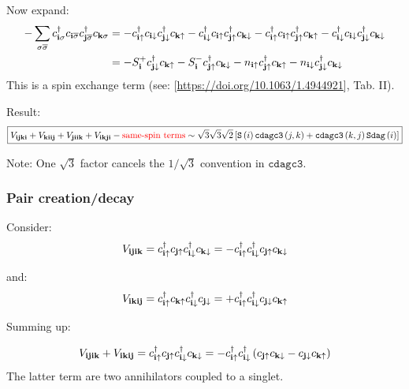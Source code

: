 \documentclass[12pt,paper=a4,BCOR=16mm]{article}
\newcommand{\cs}[1]{c_{#1\sigma}}
\newcommand{\cdags}[1]{c^{\dagger}_{#1\sigma}}
\newcommand{\cS}[1]{c_{#1\overline{\sigma}}}
\newcommand{\cdagS}[1]{c^{\dagger}_{#1\overline{\sigma}}}
\newcommand{\cUP}[1]{c_{#1\uparrow}}
\newcommand{\cdagUP}[1]{c^{\dagger}_{#1\uparrow}}
\newcommand{\cDN}[1]{c_{#1\downarrow}}
\newcommand{\cdagDN}[1]{c^{\dagger}_{#1\downarrow}}
\newcommand{\nUP}[1]{n_{#1\uparrow}}
\newcommand{\nDN}[1]{n_{#1\downarrow}}
\begin{document}
Now expand:
\begin{equation}
\begin{split}
-\sum_{\sigma\overline{\sigma}} \cdags{\v{i}} \cS{\v{i}} \cdagS{\v{j}} \cs{\v{k}} 
&= 
-\cdagUP{\v{i}} \cDN{\v{i}} \cdagDN{\v{j}} \cUP{\v{k}}
-\cdagDN{\v{i}} \cUP{\v{i}} \cdagUP{\v{j}} \cDN{\v{k}}
-\cdagUP{\v{i}} \cUP{\v{i}} \cdagUP{\v{j}} \cUP{\v{k}}
-\cdagDN{\v{i}} \cDN{\v{i}} \cdagDN{\v{j}} \cDN{\v{k}} \\
&= 
-S^+_{\v{i}} \cdagDN{\v{j}} \cUP{\v{k}} 
-S^-_{\v{i}} \cdagUP{\v{j}} \cDN{\v{k}}
-\nUP{\v{i}} \cdagUP{\v{j}} \cUP{\v{k}}
-\nDN{\v{i}} \cdagDN{\v{j}} \cDN{\v{k}}
\end{split}
\end{equation}
This is a spin exchange term (see: [\url{https://doi.org/10.1063/1.4944921}], Tab. II).

Result:
\begin{equation}
\boxed{ V_{\mathbf{ijki}} + V_{\mathbf{kiij}} + V_{\mathbf{jiik}} + V_{\mathbf{ikji}} - {\color{red}\text{same-spin terms}} 
\sim \sqrt{3}\sqrt{3}\sqrt{2} \left[ \mathtt{S}\left(i\right) \mathtt{cdagc3}\left(j,k\right) + \mathtt{cdagc3}\left(k,j\right) \mathtt{Sdag}\left(i\right) \right]
}
\end{equation}

Note: One $\sqrt{3}$ factor cancels the $1/\sqrt{3}$ convention in $\mathtt{cdagc3}$.

\subsubsection{Pair creation/decay}

Consider:
\begin{equation}
V_{\v{ijik}} = \cdagUP{\v{i}} \cUP{\v{j}} \cdagDN{\v{i}} \cDN{\v{k}} 
= - \cdagUP{\v{i}}\cdagDN{\v{i}} \cUP{\v{j}}\cDN{\v{k}}
\end{equation}

and: 
\begin{equation}
V_{\v{ikij}} = \cdagUP{\v{i}} \cUP{\v{k}} \cdagDN{\v{i}} \cDN{\v{j}} 
= +\cdagUP{\v{i}}\cdagDN{\v{i}} \cDN{\v{j}}\cUP{\v{k}}
\end{equation}

Summing up:

\begin{equation}
V_{\v{ijik}} + V_{\v{ikij}} = 
\cdagUP{\v{i}} \cUP{\v{j}} \cdagDN{\v{i}} \cDN{\v{k}} 
= - \cdagUP{\v{i}}\cdagDN{\v{i}} \lr{ \cUP{\v{j}}\cDN{\v{k}} - \cDN{\v{j}}\cUP{\v{k}} } 
\end{equation}
The latter term are two annihilators coupled to a singlet.
\end{document}
